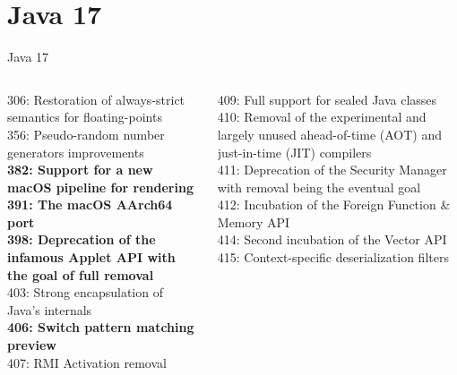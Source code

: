 \documentclass[aspectratio=169]{beamer}
\begin{document}
{
    \section{Java 17}
}
\begin{frame}[fragile]{Java 17}\scriptsize
    \begin{columns}[T] %
        
        \begin{column}[T]{6cm} %
            306: Restoration of always-strict semantics for floating-points\\
            356: Pseudo-random number generators improvements\\
            \textbf{382: Support for a new macOS pipeline for rendering}\\
            \textbf{391: The macOS AArch64 port}\\
            \textbf{398: Deprecation of the infamous Applet API with the goal of full removal}\\
            403: Strong encapsulation of Java’s internals\\
            \textbf{406: Switch pattern matching preview}\\
            407: RMI Activation removal\\
        \end{column}
        \begin{column}[T]{6cm} %
             409: Full support for sealed Java classes\\
             410: Removal of the experimental and largely unused ahead-of-time (AOT) and just-in-time (JIT) compilers\\
             411: Deprecation of the Security Manager with removal being the eventual goal\\
             412: Incubation of the Foreign Function \& Memory API\\
             414: Second incubation of the Vector API\\
             415: Context-specific deserialization filters\\
        \end{column}
    \end{columns}
\end{frame}
\end{document}
